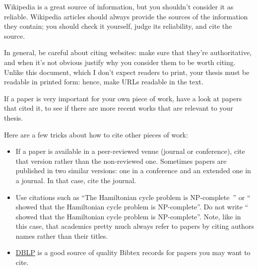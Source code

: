 Wikipedia is a great source of information, but you shouldn't consider it as reliable.
Wikipedia articles should always provide the sources of the information they contain; you
should check it yourself, judge its reliability, and cite the source.

In general, be careful about citing websites: make sure that they're authoritative, and when it's not obvious justify why you consider them to be worth citing. Unlike this document, which I don't expect readers to print, your thesis must be readable in printed form: hence, make URLs readable in the text.

If a paper is very important for your own piece of work, have a look at papers
that cited it, to see if there are more recent works that are relevant to your thesis.

Here are a few tricks about how to cite other pieces of work:
\begin{itemize}
  \item If a paper is available in a peer-reviewed venue (journal or conference), cite that
  version rather than the non-reviewed one. Sometimes papers are published in two similar
  versions: one in a conference and an extended one in a journal. In that case, cite the
  journal.
  \item Use citations such as ``The Hamiltonian cycle problem is
  NP-complete~\cite{DBLP:conf/coco/Karp72}'' or ``\textcite{DBLP:conf/coco/Karp72} showed
  that the Hamiltonian cycle problem is NP-complete''. Do not write
  ``\cite{DBLP:conf/coco/Karp72} showed that the Hamiltonian cycle problem is NP-complete''. Note, like in this case, that academics pretty much always refer to papers by citing authors names rather than their titles.
  \item \href{https://dblp.org}{DBLP} is a good source of quality Bibtex records for papers
  you may want to cite.
\end{itemize}
